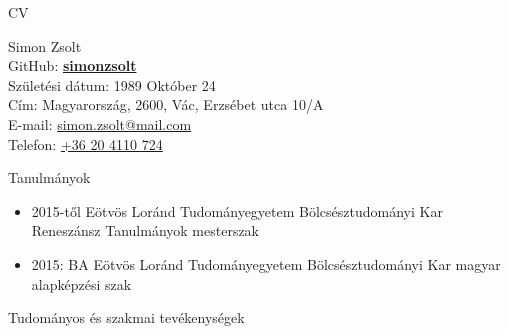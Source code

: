 \documentclass[12pt,oneside,a4paper]{article}
\begin{document}
\large{CV}

\vspace{1em}

Simon Zsolt\\ 
GitHub: \href{https://github.com/simonzsolt}{\textbf{simonzsolt}}\\
Születési dátum: 1989 Október 24\\
Cím: Magyarország, 2600, Vác, Erzsébet utca 10/A\\
E-mail: \href{mailto:simon.zsolt@mail.com}{simon.zsolt@mail.com}\\
Telefon: \href{tel:0036204110724}{+36 20 4110 724}

\vspace{1em}

Tanulmányok

\begin{itemize}
  \item{ 2015-től Eötvös Loránd Tudományegyetem Bölcsésztudományi Kar Reneszánsz Tanulmányok mesterszak }
  \item{ 2015: BA Eötvös Loránd Tudományegyetem Bölcsésztudományi Kar magyar alapképzési szak }
\end{itemize}

Tudományos és szakmai tevékenységek
\end{document}
